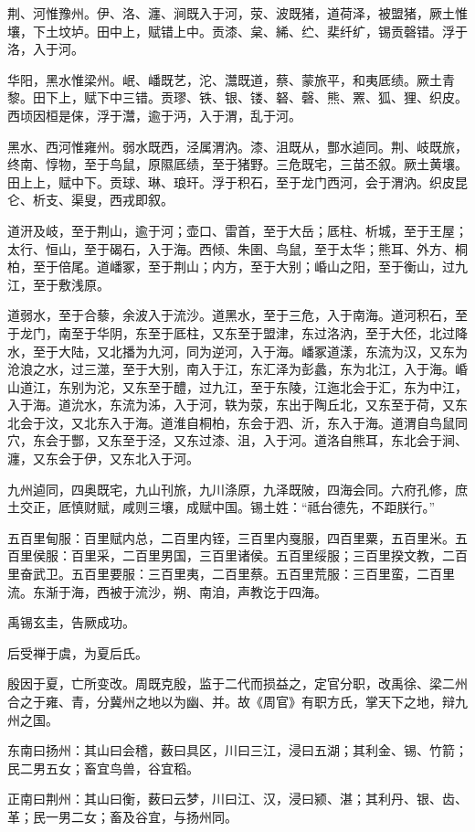 \documentclass[]{article}
\begin{document}
荆、河惟豫州。伊、洛、瀍、涧既入于河，荥、波既猪，道荷泽，被盟猪，厥土惟壤，下土坟垆。田中上，赋错上中。贡漆、枲、絺、纻、棐纤纩，锡贡磬错。浮于洛，入于河。

华阳，黑水惟梁州。岷、嶓既艺，沱、灊既道，蔡、蒙旅平，和夷厎绩。厥土青黎。田下上，赋下中三错。贡璆、铁、银、镂、砮、磬、熊、罴、狐、狸、织皮。西顷因桓是俫，浮于灊，逾于沔，入于渭，乱于河。

黑水、西河惟雍州。弱水既西，泾属渭汭。漆、沮既从，酆水逌同。荆、岐既旅，终南、惇物，至于鸟鼠，原隰厎绩，至于猪野。三危既宅，三苗丕叙。厥土黄壤。田上上，赋中下。贡球、琳、琅玕。浮于积石，至于龙门西河，会于渭汭。织皮昆仑、析支、渠叟，西戎即叙。

道汧及岐，至于荆山，逾于河；壶口、雷首，至于大岳；厎柱、析城，至于王屋；太行、恒山，至于碣石，入于海。西倾、朱圉、鸟鼠，至于太华；熊耳、外方、桐柏，至于倍尾。道嶓冢，至于荆山；内方，至于大别；崏山之阳，至于衡山，过九江，至于敷浅原。

道弱水，至于合藜，余波入于流沙。道黑水，至于三危，入于南海。道河积石，至于龙门，南至于华阴，东至于厎柱，又东至于盟津，东过洛汭，至于大伾，北过降水，至于大陆，又北播为九河，同为逆河，入于海。嶓冢道漾，东流为汉，又东为沧浪之水，过三澨，至于大别，南入于江，东汇泽为彭蠡，东为北江，入于海。崏山道江，东别为沱，又东至于醴，过九江，至于东陵，江迤北会于汇，东为中江，入于海。道沇水，东流为泲，入于河，轶为荥，东出于陶丘北，又东至于荷，又东北会于汶，又北东入于海。道淮自桐柏，东会于泗、沂，东入于海。道渭自鸟鼠同穴，东会于酆，又东至于泾，又东过漆、沮，入于河。道洛自熊耳，东北会于涧、瀍，又东会于伊，又东北入于河。

九州逌同，四奥既宅，九山刊旅，九川涤原，九泽既陂，四海会同。六府孔修，庶土交正，厎慎财赋，咸则三壤，成赋中国。锡土姓：``祗台德先，不距朕行。''

五百里甸服：百里赋内总，二百里内铚，三百里内戛服，四百里粟，五百里米。五百里侯服：百里采，二百里男国，三百里诸侯。五百里绥服；三百里揆文教，二百里奋武卫。五百里要服：三百里夷，二百里蔡。五百里荒服：三百里蛮，二百里流。东渐于海，西被于流沙，朔、南洎，声教讫于四海。

禹锡玄圭，告厥成功。

后受禅于虞，为夏后氏。

殷因于夏，亡所变改。周既克殷，监于二代而损益之，定官分职，改禹徐、梁二州合之于雍、青，分冀州之地以为幽、并。故《周官》有职方氏，掌天下之地，辩九州之国。

东南曰扬州：其山曰会稽，薮曰具区，川曰三江，浸曰五湖；其利金、锡、竹箭；民二男五女；畜宜鸟兽，谷宜稻。

正南曰荆州：其山曰衡，薮曰云梦，川曰江、汉，浸曰颍、湛；其利丹、银、齿、革；民一男二女；畜及谷宜，与扬州同。
\end{document}
